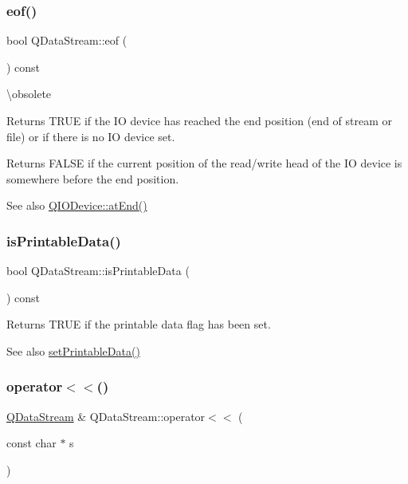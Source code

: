 \subsubsection{\texorpdfstring{eof()}{eof()}}
{\footnotesize\ttfamily bool Q\+Data\+Stream\+::eof (\begin{DoxyParamCaption}{ }\end{DoxyParamCaption}) const\hspace{0.3cm}{\ttfamily [inline]}}

\textbackslash{}obsolete

Returns T\+R\+UE if the IO device has reached the end position (end of stream or file) or if there is no IO device set.

Returns F\+A\+L\+SE if the current position of the read/write head of the IO device is somewhere before the end position.

\begin{DoxySeeAlso}{See also}
\mbox{\hyperlink{class_q_i_o_device_ac5a3fcc9349a98d8f260039c5fd58812}{Q\+I\+O\+Device\+::at\+End()}} 
\end{DoxySeeAlso}
\mbox{\label{class_q_data_stream_a4e80198a5291fbe3ab05c864bc0dbe69}} 
\subsubsection{\texorpdfstring{isPrintableData()}{isPrintableData()}}
{\footnotesize\ttfamily bool Q\+Data\+Stream\+::is\+Printable\+Data (\begin{DoxyParamCaption}{ }\end{DoxyParamCaption}) const\hspace{0.3cm}{\ttfamily [inline]}}

Returns T\+R\+UE if the printable data flag has been set. \begin{DoxySeeAlso}{See also}
\mbox{\hyperlink{class_q_data_stream_acc3df7d01950ab1a4673019f4f471e8d}{set\+Printable\+Data()}} 
\end{DoxySeeAlso}
\mbox{\label{class_q_data_stream_acf97e65484056bc6b3fb150c4f339344}} 
\subsubsection{\texorpdfstring{operator$<$$<$()}{operator<<()}\hspace{0.1cm}{\footnotesize\ttfamily [1/11]}}
{\footnotesize\ttfamily \mbox{\hyperlink{class_q_data_stream}{Q\+Data\+Stream}} \& Q\+Data\+Stream\+::operator$<$$<$ (\begin{DoxyParamCaption}\item[{const char $\ast$}]{s }\end{DoxyParamCaption})}

